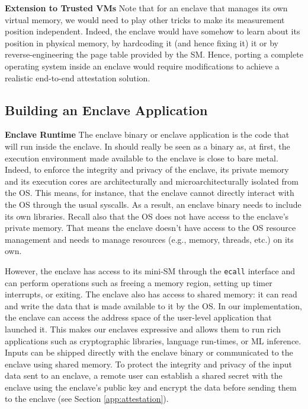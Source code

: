 \noindent\textbf{Extension to Trusted VMs}
Note that for an enclave that manages its own virtual memory, we would need to play other tricks to make its measurement position independent.
Indeed, the enclave would have somehow to learn about its position in physical memory, by hardcoding it (and hence fixing it) it or by reverse-engineering the page table provided by the SM.
Hence, porting a complete operating system inside an enclave would require modifications to achieve a realistic end-to-end attestation solution.

\subsection{Building an Enclave Application}

\noindent\textbf{Enclave Runtime}
The enclave binary or enclave application is the code that will run inside the enclave.
In should really be seen as a binary as, at first, the execution environment made available to the enclave is close to bare metal.
Indeed, to enforce the integrity and privacy of the enclave, its private memory and its execution cores are architecturally and microarchitecturally isolated from the OS.
This means, for instance, that the enclave cannot directly interact with the OS through the usual syscalls.
As a result, an enclave binary needs to include its own libraries.
Recall also that the OS does not have access to the enclave's private memory.
That means the enclave doesn't have access to the OS resource management and needs to manage resources (e.g., memory, threads, etc.) on its own.

However, the enclave has access to its mini-SM through the \verb|ecall| interface and can perform operations such as freeing a memory region, setting up timer interrupts, or exiting.
The enclave also has access to shared memory: it can read and write the data that is made available to it by the OS.
In our implementation, the enclave can access the address space of the user-level application that launched it.
This makes our enclaves expressive and allows them to run rich applications such as cryptographic libraries, language run-times, or ML inference.
Inputs can be shipped directly with the enclave binary or communicated to the enclave using shared memory.
To protect the integrity and privacy of the input data sent to an enclave, a remote user can establish a shared secret with the enclave using the enclave's public key and encrypt the data before sending them to the enclave (see Section \ref{app:attestation}).


